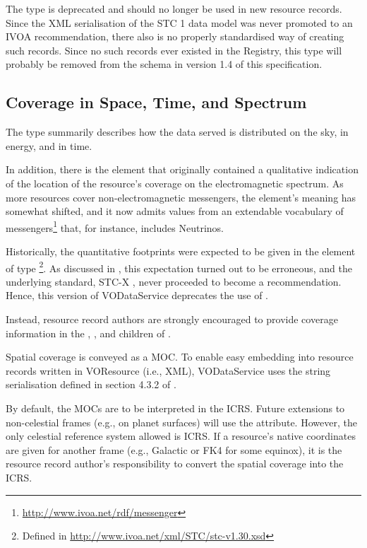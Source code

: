 \documentclass[11pt,a4paper]{ivoa}
\begin{document}
The  type is deprecated and should no longer be
used in new resource records.  Since the XML serialisation of the STC 1
data model was never promoted to an IVOA recommendation, there also is
no properly standardised way of creating such records.  Since no such
records ever existed in the Registry, this type will probably be removed
from the schema in version 1.4 of this specification.



\subsection{Coverage in Space, Time, and Spectrum}
\label{sect:cover}

The  type summarily describes how the data served is
distributed on the
sky, in energy, and in time.

In addition, there is the  element that originally
contained a qualitative indication of the location of the resource's
coverage on the electromagnetic spectrum.  As more resources cover
non-elec\-tromagnetic messengers, the element's meaning has somewhat
shifted, and it now admits values from an extendable vocabulary of
messengers\footnote{\url{http://www.ivoa.net/rdf/messenger}} that, for
instance, includes Neutrinos.

Historically, the quantitative footprints were expected to be given in
the element of type \footnote{Defined in
\url{http://www.ivoa.net/xml/STC/stc-v1.30.xsd}}.  As discussed in
\citet{note:regstc}, this expectation turned out to be erroneous,
and the underlying standard, STC-X \citep{note:stcx}, never proceeded to become
a recommendation.  Hence, this version of VODataService deprecates the
use of .

Instead, resource record authors are strongly encouraged to provide
coverage information in the , , and
 children of .

Spatial coverage is conveyed as a MOC.  To enable easy embedding into
resource records written in VOResource (i.e., XML),
VODataService uses the string serialisation defined in section 4.3.2 of
\citet{2022ivoa.spec.0727F}.

By default, the MOCs are to be interpreted in the ICRS.  Future
extensions to non-celestial frames (e.g., on planet
surfaces) will use the  attribute.
However, the only celestial reference system allowed is
ICRS.  If a resource's native coordinates are given for another frame (e.g.,
Galactic or FK4 for some equinox), it is the resource record author's
responsibility to convert the spatial coverage into the ICRS.
\end{document}
